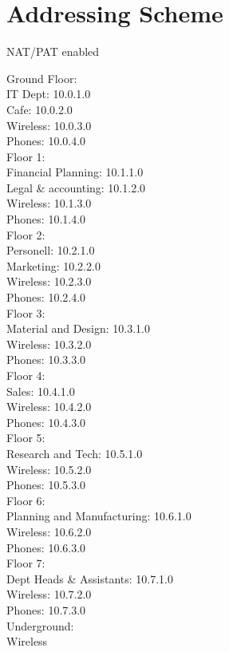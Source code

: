 \chapter{Addressing Scheme}

\begin{huge}
    NAT/PAT enabled
\end{huge}

Ground Floor:\\
IT Dept: 10.0.1.0\\
Cafe:    10.0.2.0\\
Wireless: 10.0.3.0\\
Phones: 10.0.4.0\\

Floor 1:\\
Financial Planning: 10.1.1.0\\
Legal \& accounting: 10.1.2.0\\
Wireless: 10.1.3.0\\
Phones: 10.1.4.0\\

Floor 2:\\
Personell: 10.2.1.0\\
Marketing: 10.2.2.0\\
Wireless: 10.2.3.0\\
Phones: 10.2.4.0\\

Floor 3:\\
Material and Design: 10.3.1.0\\
Wireless: 10.3.2.0\\
Phones: 10.3.3.0\\

Floor 4:\\
Sales: 10.4.1.0\\
Wireless: 10.4.2.0\\
Phones: 10.4.3.0\\

Floor 5:\\
Research and Tech: 10.5.1.0\\
Wireless: 10.5.2.0\\
Phones: 10.5.3.0\\

Floor 6:\\
Planning and Manufacturing: 10.6.1.0\\
Wireless: 10.6.2.0\\
Phones: 10.6.3.0\\

Floor 7:\\
Dept Heads \& Assistants: 10.7.1.0\\
Wireless: 10.7.2.0\\
Phones: 10.7.3.0\\

Underground:\\
Wireless\\
